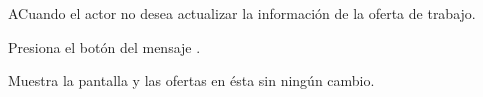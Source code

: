 	\begin{UCtrayectoriaA}{A}{Cuando el actor no desea actualizar la información de la oferta de trabajo.}

		\UCpaso [\UCactor] Presiona el botón  del mensaje .

		\UCpaso Muestra la pantalla  y las ofertas en ésta sin ningún cambio. 

	\end{UCtrayectoriaA}

